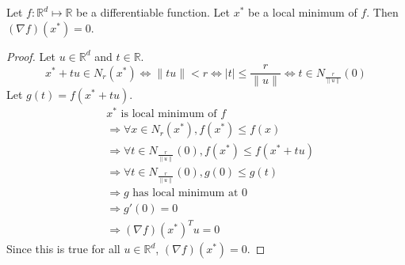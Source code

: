 \begin{theorem} Let $f: \mathbb{R}^d \mapsto \mathbb{R}$ be a differentiable function.
Let $x^*$ be a local minimum of $f$. Then $(\nabla f)(x^*) = 0$.
\end{theorem}
\begin{proof}
Let $u \in \mathbb{R}^d$ and $t \in \mathbb{R}$.
\[ x^* + tu \in N_r(x^*) \iff \|tu\| < r \iff |t| \le \frac{r}{\|u\|} \iff t \in N_{\frac{r}{\|u\|}}(0) \]
Let $g(t) = f(x^* + tu)$.
\begin{align*}
& x^* \textrm{ is local minimum of } f
\\ &\Rightarrow \forall x \in N_r(x^*), f(x^*) \le f(x)
\\ &\Rightarrow \forall t \in N_{\frac{r}{\|u\|}}(0), f(x^*) \le f(x^* + tu)
\\ &\Rightarrow \forall t \in N_{\frac{r}{\|u\|}}(0), g(0) \le g(t)
\\ &\Rightarrow g \textrm{ has local minimum at } 0
\\ &\Rightarrow g'(0) = 0
\\ &\Rightarrow (\nabla f)(x^*)^Tu = 0
\end{align*}
Since this is true for all $u \in \mathbb{R}^d$, $(\nabla f)(x^*) = 0$.
\end{proof}


